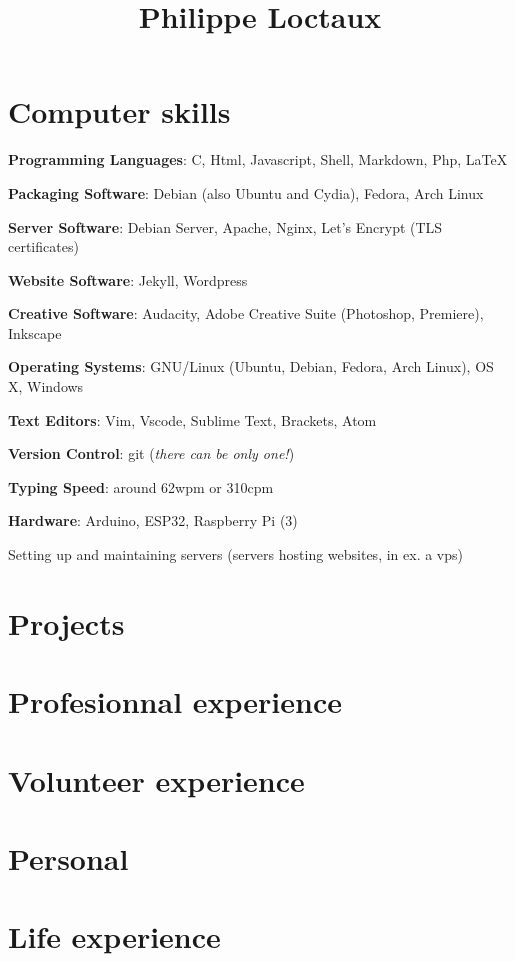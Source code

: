 \documentclass[a4paper]{article}
\title{Philippe Loctaux}
\begin{document}
\maketitle

\section*{Computer skills}

\begin{description}
	\item \textbf{Programming Languages}: C, Html, Javascript, Shell, Markdown, Php, \LaTeX
	\item \textbf{Packaging Software}: Debian (also Ubuntu and Cydia), Fedora, Arch Linux
	\item \textbf{Server Software}: Debian Server, Apache, Nginx, Let's Encrypt (TLS certificates)
	\item \textbf{Website Software}: Jekyll, Wordpress
	\item \textbf{Creative Software}: Audacity, Adobe Creative Suite (Photoshop, Premiere), Inkscape
	\item \textbf{Operating Systems}: GNU/Linux (Ubuntu, Debian, Fedora, Arch Linux), OS X, Windows
	\item \textbf{Text Editors}: Vim, Vscode, Sublime Text, Brackets, Atom
	\item \textbf{Version Control}: git (\textit{there can be only one!})
	\item \textbf{Typing Speed}: around 62wpm or 310cpm
	\item \textbf{Hardware}: Arduino, ESP32, Raspberry Pi (3)
	\item Setting up and maintaining servers (servers hosting websites, in ex. a vps)
\end{description}

\section*{Projects}
\section*{Profesionnal experience}
\section*{Volunteer experience}
\section*{Personal}
\section*{Life experience}
\end{document}

